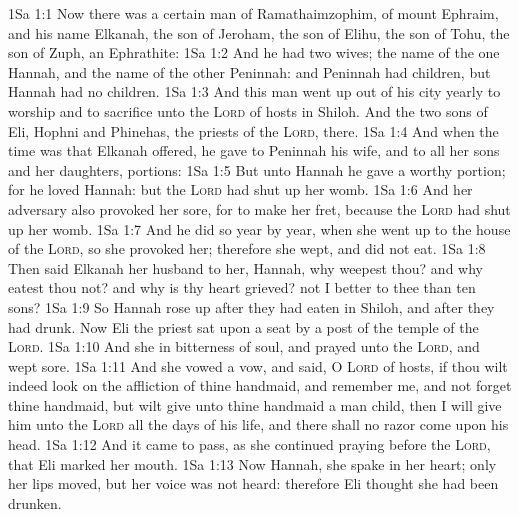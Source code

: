 \vs 1Sa 1:1 Now there was a certain man of Ramathaimzophim, of mount Ephraim, and his name  Elkanah, the son of Jeroham, the son of Elihu, the son of Tohu, the son of Zuph, an Ephrathite:
\vs 1Sa 1:2 And he had two wives; the name of the one  Hannah, and the name of the other Peninnah: and Peninnah had children, but Hannah had no children.
\vs 1Sa 1:3 And this man went up out of his city yearly to worship and to sacrifice unto the \textsc{Lord} of hosts in Shiloh. And the two sons of Eli, Hophni and Phinehas, the priests of the \textsc{Lord},  there.
\vs 1Sa 1:4 And when the time was that Elkanah offered, he gave to Peninnah his wife, and to all her sons and her daughters, portions:
\vs 1Sa 1:5 But unto Hannah he gave a worthy portion; for he loved Hannah: but the \textsc{Lord} had shut up her womb.
\vs 1Sa 1:6 And her adversary also provoked her sore, for to make her fret, because the \textsc{Lord} had shut up her womb.
\vs 1Sa 1:7 And  he did so year by year, when she went up to the house of the \textsc{Lord}, so she provoked her; therefore she wept, and did not eat.
\vs 1Sa 1:8 Then said Elkanah her husband to her, Hannah, why weepest thou? and why eatest thou not? and why is thy heart grieved?  not I better to thee than ten sons?
\vs 1Sa 1:9 So Hannah rose up after they had eaten in Shiloh, and after they had drunk. Now Eli the priest sat upon a seat by a post of the temple of the \textsc{Lord}.
\vs 1Sa 1:10 And she  in bitterness of soul, and prayed unto the \textsc{Lord}, and wept sore.
\vs 1Sa 1:11 And she vowed a vow, and said, O \textsc{Lord} of hosts, if thou wilt indeed look on the affliction of thine handmaid, and remember me, and not forget thine handmaid, but wilt give unto thine handmaid a man child, then I will give him unto the \textsc{Lord} all the days of his life, and there shall no razor come upon his head.
\vs 1Sa 1:12 And it came to pass, as she continued praying before the \textsc{Lord}, that Eli marked her mouth.
\vs 1Sa 1:13 Now Hannah, she spake in her heart; only her lips moved, but her voice was not heard: therefore Eli thought she had been drunken.
